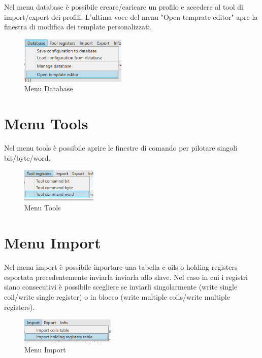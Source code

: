 Nel menu database è possibile creare/caricare un profilo e accedere al tool di import/export dei
profili. L'ultima voce del menu "Open temprate editor" apre la finestra di modifica dei template
personalizzati.

\begin{figure}[H]
\centering
\includegraphics[width=0.45\textwidth]{../Img/Menu_Database.PNG}
\caption{Menu Database}
\end{figure}

\section{Menu Tools}

Nel menu tools è possibile aprire le finestre di comando per pilotare singoli bit/byte/word.

\begin{figure}[H]
\centering
\includegraphics[width=0.32\textwidth]{../Img/Menu_Tools.PNG}
\caption{Menu Tools}
\end{figure}

\section{Menu Import}

Nel menu import è possibile inportare una tabella c
oils o holding registers esportata precedentemente
inviarla inviarla allo slave. Nel caso in cui i registri 
siano consecutivi è possibile scegliere se
inviarli singolarmente (write single coil/write single register) o in blocco 
(write multiple coils/write multiple registers).

\begin{figure}[H]
\centering
\includegraphics[width=0.4\textwidth]{../Img/Menu_Import.PNG}
\caption{Menu Import}
\end{figure}

